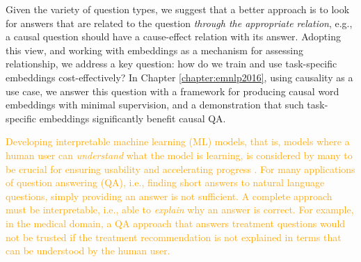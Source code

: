 Given the variety of question types, we suggest that a better approach is to look for answers that are related to the question \emph{through the appropriate relation}, e.g., a causal question should have a cause-effect relation with its answer.
Adopting this view, and working with embeddings as a mechanism for assessing relationship, we address a key question: how do we train and use task-specific embeddings cost-effectively? 
In Chapter \ref{chapter:emnlp2016}, using causality as a use case, we answer this question with a framework for producing causal word embeddings with minimal supervision, and a demonstration that such task-specific embeddings significantly benefit causal QA. 


\address{BUT, these shallower methods lose some of the explainability (get only a set of associations and weights on association features), so we develop approaches that focus on explanation, aggregation, and robustness}

\address{two approaches (one more structured, one with learned representations) for answering science questions and providing compelling, human-readable explanations for the answers.}

\address{Latent layer/intermediate output learned during training which correlates with what the model is learning}

\textcolor{orange}{
Developing interpretable machine learning (ML) models, that is, models where a human user can \emph{understand} what the model is learning, is considered by many to be crucial for ensuring usability and accelerating progress \cite{craven1996extracting,Kim2015MindTG, letham2015interpretable, Ribeiro2016WhySI}.  
For many applications of question answering (QA), i.e., finding short answers to natural language questions, simply providing an answer is not sufficient. A complete approach must be interpretable, i.e., able to {\em explain} why an answer is correct. 
For example, in the medical domain, a QA approach that answers treatment questions would not be trusted if the treatment recommendation is not explained in terms that can be understood by the human user. }

